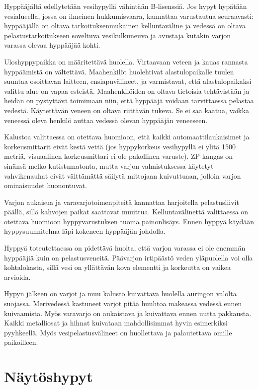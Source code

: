 Hyppääjältä edellytetään vesihypyllä vähintään B-lisenssiä. Jos hypyt hypätään vesialueella, jossa on ilmeinen hukkumisvaara, kannattaa varustautua seuraavasti: hyppääjällä on oltava tarkoituksenmukainen kelluntaväline ja vedessä on oltava pelastustarkoitukseen soveltuva vesikulkuneuvo ja avustaja kutakin varjon varassa olevaa hyppääjää kohti. 


Uloshyppypaikka on määritettävä huolella. Virtaavaan veteen ja kauas rannasta hyppäämistä on vältettävä. Maahenkilöt huolehtivat alastulopaikalle tuulen suuntaa osoittavan laitteen, ensiapuvälineet, ja varmistavat, että alastulopaikaksi valittu alue on vapaa esteistä. Maahenkilöiden on oltava tietoisia tehtävistään ja heidän on pystyttävä toimimaan niin, että hyppääjä voidaan tarvittaessa pelastaa vedestä. Käytettävän veneen on oltava riittävän tukeva. Se ei saa kaatua, vaikka veneessä oleva henkilö auttaa vedessä olevan hyppääjän veneeseen.  


Kalustoa valittaessa on otettava huomioon, että kaikki automaattilaukaisimet ja korkeusmittarit eivät kestä vettä (jos hyppykorkeus vesihypyllä ei ylitä 1500 metriä, visuaalinen korkeusmittari ei ole pakollinen varuste). ZP-kangas on sinänsä melko kutistumatonta, mutta varjon valmistuksessa käytetyt vahvikenauhat eivät välttämättä säilytä mittojaan kuivuttuaan, jolloin varjon ominaisuudet huonontuvat.  


Varjon aukaisua ja varavarjotoimenpiteitä kannattaa harjoitella pelastusliivit päällä, sillä kahvojen paikat saattavat muuttua. Kelluntavälinettä valittaessa on otettava huomioon hyppyvarustuksen tuoma painonlisäys. Ennen hyppyä käydään hyppysuunnitelma läpi kokeneen hyppääjän johdolla. 


Hyppyä toteutettaessa on pidettävä huolta, että varjon varassa ei ole enemmän hyppääjiä kuin on pelastusveneitä. Päävarjon irtipäästö veden yläpuolella voi olla kohtalokasta, sillä vesi on yllättävän kova elementti ja korkeutta on vaikea arvioida.  


Hypyn jälkeen on varjot ja muu kalusto kuivattava huolella auringon valolta suojassa. Merivedessä kastuneet varjot pitää huuhtoa makeassa vedessä ennen kuivaamista. Myös varavarjo on aukaistava ja kuivattava ennen uutta pakkausta. Kaikki metalliosat ja hihnat kuivataan mahdollisimmat hyvin esimerkiksi pyyhkeellä. Myös vesipelastusvälineet on huollettava ja palautettava omille paikoilleen. 

\section{ Näytöshypyt }
\label{erikoishypyt-naytoshypyt}


